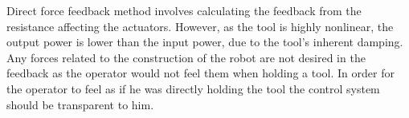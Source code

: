 
Direct force feedback method involves calculating the feedback from the resistance affecting the actuators. %
However, as the tool is highly nonlinear, the output power is lower than the input power, due to the tool's inherent damping.
Any forces related to the construction of the robot are not desired in the feedback as the operator would not feel them when holding a tool. In order for the operator to feel as if he was directly holding the tool the control system should be transparent to him.



